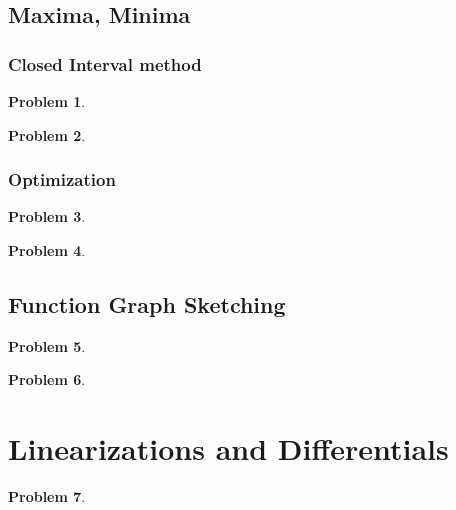 \documentclass{article}
\newtheorem{problem}{Problem}
\begin{document}
\subsection{Maxima, Minima}\label{secMPSoneVariableMinMax}
\subsubsection{Closed Interval method}\label{secMPSclosedInterval}
\begin{problem}

\end{problem}


\begin{problem}

\end{problem}

\subsubsection{Optimization}\label{secMPSoptimization}
\begin{problem}

\end{problem}
\begin{problem}

\end{problem}


\subsection{Function Graph Sketching}\label{secMPSfunctionGraphSketching}
\begin{problem}

\end{problem}


\begin{problem}

\end{problem}

\section{Linearizations and Differentials} \label{secMPSLinearizationAndDifferentials}
\begin{problem}

\end{problem}

\end{document}
